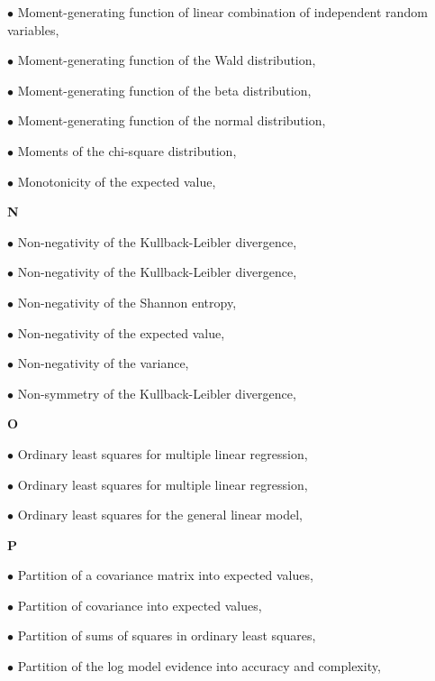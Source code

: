 \documentclass[a4paper,12pt,twoside]{book}
\begin{document}
$\bullet$ Moment-generating function of linear combination of independent random variables, \pageref{sec:mgf-lincomb}

$\bullet$ Moment-generating function of the Wald distribution, \pageref{sec:wald-mgf}

$\bullet$ Moment-generating function of the beta distribution, \pageref{sec:beta-mgf}

$\bullet$ Moment-generating function of the normal distribution, \pageref{sec:norm-mgf}

$\bullet$ Moments of the chi-square distribution, \pageref{sec:chi2-mom}

$\bullet$ Monotonicity of the expected value, \pageref{sec:mean-mono}


\vspace{1em}
\textbf{N}

$\bullet$ Non-negativity of the Kullback-Leibler divergence, \pageref{sec:kl-nonneg}

$\bullet$ Non-negativity of the Kullback-Leibler divergence, \pageref{sec:kl-nonneg2}

$\bullet$ Non-negativity of the Shannon entropy, \pageref{sec:ent-nonneg}

$\bullet$ Non-negativity of the expected value, \pageref{sec:mean-nonneg}

$\bullet$ Non-negativity of the variance, \pageref{sec:var-nonneg}

$\bullet$ Non-symmetry of the Kullback-Leibler divergence, \pageref{sec:kl-nonsymm}


\vspace{1em}
\textbf{O}

$\bullet$ Ordinary least squares for multiple linear regression, \pageref{sec:mlr-ols}

$\bullet$ Ordinary least squares for multiple linear regression, \pageref{sec:mlr-ols2}

$\bullet$ Ordinary least squares for the general linear model, \pageref{sec:glm-ols}


\vspace{1em}
\textbf{P}

$\bullet$ Partition of a covariance matrix into expected values, \pageref{sec:covmat-mean}

$\bullet$ Partition of covariance into expected values, \pageref{sec:cov-mean}

$\bullet$ Partition of sums of squares in ordinary least squares, \pageref{sec:mlr-pss}

$\bullet$ Partition of the log model evidence into accuracy and complexity, \pageref{sec:lme-anc}
\end{document}
